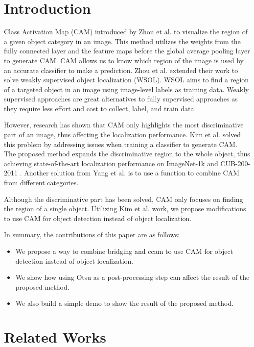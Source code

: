 \documentclass[conference]{IEEEtran}
\begin{document}
\section{Introduction}
Class Activation Map (CAM) introduced by Zhou et al. \cite{} to visualize the region of a given object category in an image. This method utilizes the weights from the fully connected layer and the feature maps before the global average pooling layer to generate CAM. CAM allows us to know which region of the image is used by an accurate classifier to make a prediction. Zhou et al. extended their work to solve weakly supervised object localization (WSOL). WSOL aims to find a region of a targeted object in an image using image-level labels as training data. Weakly supervised approaches are great alternatives to fully supervised approaches \cite{} as they require less effort and cost to collect, label, and train data.

However, research has shown that CAM only highlights the most discriminative part of an image, thus affecting the localization performance. Kim et al. \cite{} solved this problem by addressing issues when training a classifier to generate CAM. The proposed method expands the discriminative region to the whole object, thus achieving state-of-the-art localization performance on ImageNet-1k \cite{} and CUB-200-2011 \cite{}. Another solution from Yang et al. \cite{} is to use a function to combine CAM from different categories.

Although the discriminative part has been solved, CAM only focuses on finding the region of a single object. Utilizing Kim et al. \cite{} work, we propose modifications to use CAM for object detection instead of object localization.

In summary, the contributions of this paper are as follows:
\begin{itemize}
    \item We propose a way to combine bridging \cite{} and ccam \cite{} to use CAM for object detection instead of object localization.
    \item We show how using Otsu as a post-processing step can affect the result of the proposed method.
    \item We also build a simple demo to show the result of the proposed method.
\end{itemize}

\section{Related Works}
\end{document}

